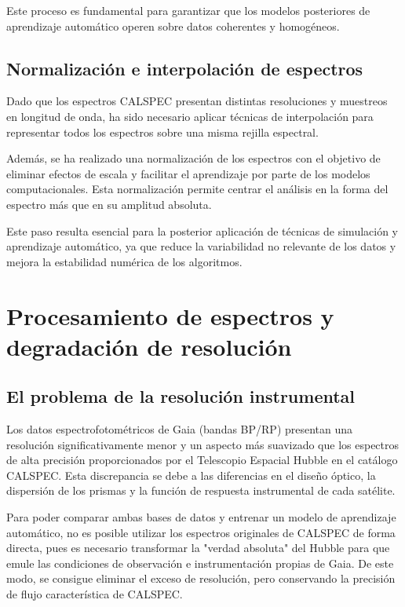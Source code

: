 \documentclass{article}
\begin{document}
Este proceso es fundamental para garantizar que los modelos posteriores de aprendizaje automático operen sobre datos coherentes y homogéneos.

\subsection{Normalización e interpolación de espectros}

Dado que los espectros CALSPEC presentan distintas resoluciones y muestreos en longitud de onda, ha sido necesario aplicar técnicas de interpolación para representar todos los espectros sobre una misma rejilla espectral.

Además, se ha realizado una normalización de los espectros con el objetivo de eliminar efectos de escala y facilitar el aprendizaje por parte de los modelos computacionales. Esta normalización permite centrar el análisis en la forma del espectro más que en su amplitud absoluta.

Este paso resulta esencial para la posterior aplicación de técnicas de simulación y aprendizaje automático, ya que reduce la variabilidad no relevante de los datos y mejora la estabilidad numérica de los algoritmos.


\newpage
\newpage
\section{Procesamiento de espectros y degradación de resolución}

\subsection{El problema de la resolución instrumental}

Los datos espectrofotométricos de Gaia (bandas BP/RP) presentan una resolución significativamente menor y un aspecto más suavizado que los espectros de alta precisión proporcionados por el Telescopio Espacial Hubble en el catálogo CALSPEC. Esta discrepancia se debe a las diferencias en el diseño óptico, la dispersión de los prismas y la función de respuesta instrumental de cada satélite.

Para poder comparar ambas bases de datos y entrenar un modelo de aprendizaje automático, no es posible utilizar los espectros originales de CALSPEC de forma directa, pues es necesario transformar la "verdad absoluta" del Hubble para que emule las condiciones de observación e instrumentación propias de Gaia. De este modo, se consigue eliminar el exceso de resolución, pero conservando la precisión de flujo característica de CALSPEC.
\end{document}
